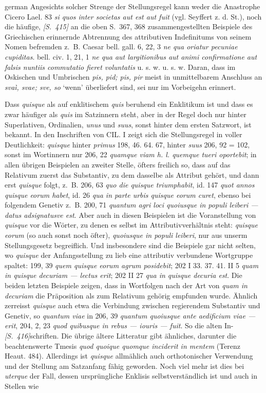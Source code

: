 \begin{otherlanguage*}{german}
Angesichts solcher Strenge der Stellungsregel kann weder die Anastrophe Cicero Lael. 83 \emph{si quos inter societas aut est aut fuit} (vgl. Seyffert z. d. St.), noch die häufige, \hypertarget{p415}{\emph{[S.~415]}}\label{p415} an die oben S.~367, 368 zusammengestellten Beispiele des Griechischen erinnernde Abtrennung des attributiven Indefinitums von seinem Nomen befremden z.~B. Caesar bell. gall. 6, 22, 3 \emph{ne qua oriatur pecuniae cupiditas}. bell. civ. 1, 21, 1 \emph{ne qua aut largitionibus aut animi confirmatione aut falsis nuntiis commutatio fieret voluntatis} u. s. w. u. s. w. Daran, dass im Oskischen und Umbrischen \emph{pis, pid; pis, pir} meist in unmittelbarem Anschluss an \emph{svaì, svae; sve, so} ‘wenn’ überliefert sind, sei nur im Vorbeigehn erinnert.

Dass \emph{quisque} als auf enklitischem \emph{quis} beruhend ein Enklitikum ist und dass es zwar häufiger als \emph{quis} im Satzinnern steht, aber in der Regel doch nur hinter Superlativen, Ordinalien, \emph{unus} und \emph{suus}, sonst hinter dem ersten Satzwort, ist bekannt. In den Inschriften von CIL. I zeigt sich die Stellungsregel in voller Deutlichkeit: \emph{quisque} hinter \emph{primus} 198, 46. 64. 67, hinter \emph{suus} 206, 92 = 102, sonst im Wortinnern nur 206, 22 \emph{quamque viam h. l. quemque tueri oportebit}; in allen übrigen Beispielen an zweiter Stelle, öfters freilich so, dass auf das Relativum zuerst das Substantiv, zu dem dasselbe als Attribut gehört, und dann erst \emph{quisque} folgt, z.~B. 206, 63 \emph{quo die quisque triumphabit}, id. 147 \emph{quot annos quisque eorum habet}, id. 26 \emph{qua in parte urbis quisque eorum curet}, ebenso bei folgendem Genetiv z.~B. 200, 71 \emph{quantum agri loci quoiusque in populi leiberi — datus adsignatusve est}. Aber auch in diesen Beispielen ist die Voranstellung von \emph{quisque} vor die Wörter, zu denen es selbst im Attributivverhältnis steht: \emph{quisque eorum} (so auch sonst noch öfter), \emph{quoiusque in populi leiberi}, nur aus unserm Stellungsgesetz begreiflich. Und insbesondere sind die Beispiele gar nicht selten, wo \emph{quisque} der Anfangsstellung zu lieb eine attributiv verbundene Wortgruppe spaltet: 199, 39 \emph{quem quisque eorum agrum posidebit}; 202 I 33. 37. 41. II 5 \emph{quam in quisque decuriam — lectus erit}; 202 II 27 \emph{qua in quisque decuria est}. Die beiden letzten Beispiele zeigen, dass in Wortfolgen nach der Art von \emph{quam in decuriam} die Präposition als zum Relativum gehörig empfunden wurde. Ähnlich zerreisst \emph{quis\-que} auch etwa die Verbindung zwischen regierendem Substantiv und Genetiv, so \emph{quantum viae} in 206, 39 \emph{quantum quoiusque ante aedificium viae — erit}, 204, 2, 23 \emph{quod quibusque in rebus — iouris — fuit}. So die alten In-\hypertarget{p415}{\emph{[S.~416]}}\label{p416}schriften. Die übrige ältere Litteratur gibt ähnliches, darunter die beachtenswerte Tmesis \emph{quod quoique quomque inciderit in mentem} (Terenz Heaut. 484). Allerdings ist \emph{quisque} allmählich auch orthotonischer Verwendung und der Stellung am Satzanfang fähig geworden. Noch viel mehr ist dies bei \emph{uterque} der Fall, dessen ursprüngliche Enklisis selbstverständlich ist und auch in Stellen wie 
\end{otherlanguage*}
